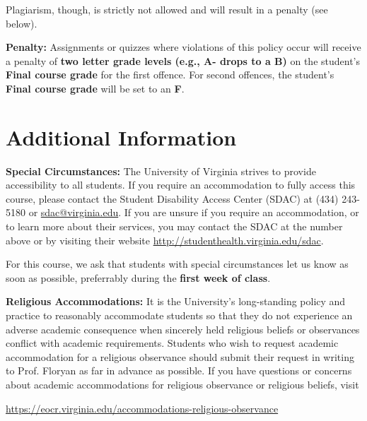 \documentclass[12pt]{article}
\begin{document}
Plagiarism, though, is strictly not allowed and will result in a penalty (see below).

\textbf{Penalty:} Assignments or quizzes where violations of this policy occur will receive a penalty of \textbf{two letter grade levels (e.g., A- drops to a B)} on the student's \textbf{Final course grade} for the first offence. For second offences, the student's \textbf{Final course grade} will be set to an \textbf{F}.

\section*{Additional Information}


\textbf{Special Circumstances:} The University of Virginia strives to provide accessibility to all students. If you require an accommodation to fully access this course, please contact the Student Disability Access Center (SDAC) at (434) 243-5180 or \url{sdac@virginia.edu}. If you are unsure if you require an accommodation, or to learn more about their services, you may contact the SDAC at the number above or by visiting their website \url{http://studenthealth.virginia.edu/sdac}.

For this course, we ask that students with special circumstances let us know as soon as possible, preferrably during the \textbf{first week of class}.

\textbf{Religious Accommodations:} It is the University's long-standing policy and practice to reasonably accommodate students so that they do not experience an adverse academic consequence when sincerely held religious beliefs or observances conflict with academic requirements.  Students who wish to request academic accommodation for a religious observance should submit their request in writing to Prof. Floryan as far in advance as possible. If you have questions or concerns about academic accommodations for religious observance or religious beliefs, visit 

\begin{center} 
    \url{https://eocr.virginia.edu/accommodations-religious-observance}
\end{center}
\end{document}
